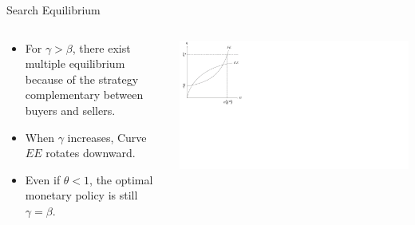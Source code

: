 \documentclass{beamer}
\begin{document}
\begin{frame}{Search Equilibrium}

    \begin{columns}
    \begin{column}{0.48\textwidth}
    \begin{itemize}

        \item For $\gamma > \beta$, there exist multiple equilibrium because of the strategy complementary between buyers and sellers. 
        \item When $\gamma$ increases, Curve $EE$ rotates downward.
        \item Even if $\theta<1$, the optimal monetary policy is still $\gamma=\beta$.
    \end{itemize}
    \end{column}
    \begin{column}{0.48\textwidth}
        \includegraphics[scale=0.4]{1.jpg}
    \end{column}
\end{columns}

\end{frame}
\end{document}
